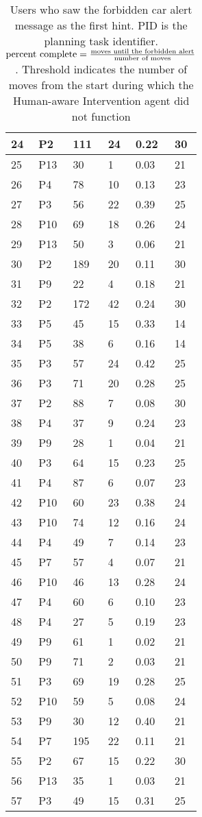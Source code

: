 \begin{table}[tpb]
{\begin{tabular}{|l|l|l|l|l|l|}
24 & P2 & 111 & 24 & 0.22 & 30 \\ \hline
25 & P13 & 30 & 1 & 0.03 & 21 \\ \hline
26 & P4 & 78 & 10 & 0.13 & 23 \\ \hline
27 & P3 & 56 & 22 & 0.39 & 25 \\ \hline
28 & P10 & 69 & 18 & 0.26 & 24 \\ \hline
29 & P13 & 50 & 3 & 0.06 & 21 \\ \hline
30 & P2 & 189 & 20 & 0.11 & 30 \\ \hline
31 & P9 & 22 & 4 & 0.18 & 21 \\ \hline
32 & P2 & 172 & 42 & 0.24 & 30 \\ \hline
33 & P5 & 45 & 15 & 0.33 & 14 \\ \hline
34 & P5 & 38 & 6 & 0.16 & 14 \\ \hline
35 & P3 & 57 & 24 & 0.42 & 25 \\ \hline
36 & P3 & 71 & 20 & 0.28 & 25 \\ \hline
37 & P2 & 88 & 7 & 0.08 & 30 \\ \hline
38 & P4 & 37 & 9 & 0.24 & 23 \\ \hline
39 & P9 & 28 & 1 & 0.04 & 21 \\ \hline
40 & P3 & 64 & 15 & 0.23 & 25 \\ \hline
41 & P4 & 87 & 6 & 0.07 & 23 \\ \hline
42 & P10 & 60 & 23 & 0.38 & 24 \\ \hline
43 & P10 & 74 & 12 & 0.16 & 24 \\ \hline
44 & P4 & 49 & 7 & 0.14 & 23 \\ \hline
45 & P7 & 57 & 4 & 0.07 & 21 \\ \hline
46 & P10 & 46 & 13 & 0.28 & 24 \\ \hline
47 & P4 & 60 & 6 & 0.10 & 23 \\ \hline
48 & P4 & 27 & 5 & 0.19 & 23 \\ \hline
49 & P9 & 61 & 1 & 0.02 & 21 \\ \hline
50 & P9 & 71 & 2 & 0.03 & 21 \\ \hline
51 & P3 & 69 & 19 & 0.28 & 25 \\ \hline
52 & P10 & 59 & 5 & 0.08 & 24 \\ \hline
53 & P9 & 30 & 12 & 0.40 & 21 \\ \hline
54 & P7 & 195 & 22 & 0.11 & 21 \\ \hline
55 & P2 & 67 & 15 & 0.22 & 30 \\ \hline
56 & P13 & 35 & 1 & 0.03 & 21 \\ \hline
57 & P3 & 49 & 15 & 0.31 & 25 \\ \hline
\end{tabular}%
}
\caption{Users who saw the forbidden car alert message as the first hint. PID is the planning task identifier. $\textup{percent complete} = \frac{\textup{moves until the forbidden alert}}{\textup{number of moves}}$. Threshold indicates the number of moves  from the start during which the Human-aware Intervention agent did not function}
\label{tab:firsthint}
\end{table}


